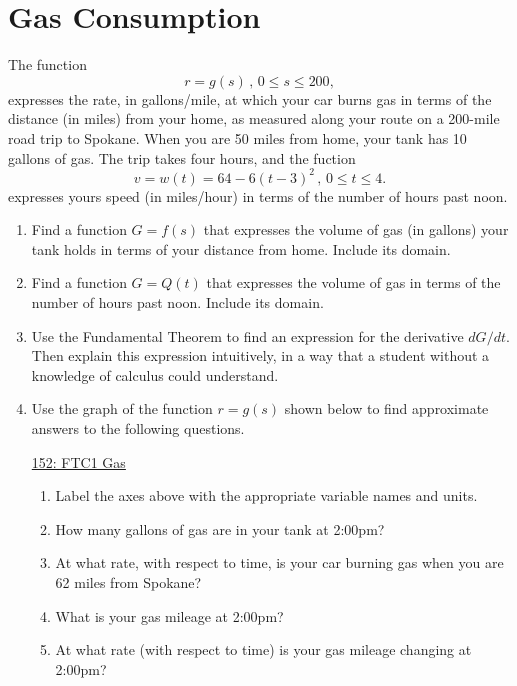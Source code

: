 \documentclass{ximera}
\begin{document}
\section{Gas Consumption}


\begin{question} \label{QoODROOOD}

The function
\[
 r =g(s) \, , \, 0\leq s \leq 200 ,
\]
 expresses the rate, in gallons/mile, at which your car burns gas in terms of the distance (in miles) from your home, as measured along your route on a 200-mile road trip to Spokane. When you are 50 miles from home, your tank has 10 gallons of gas. The trip takes four hours, and the fuction
\[
 v =w(t) = 64 - 6(t-3)^2 \, , \, 0 \leq t \leq 4. 
 \]
expresses yours speed (in miles/hour) in terms of the number of hours past noon.

\begin{enumerate}

\item Find a function $G = f(s)$ that expresses the volume of gas (in gallons) your tank holds in terms of your distance from home. Include its domain.

\item Find a function $G = Q(t)$ that expresses the volume of gas in terms of the number of hours past noon. Include its
 domain.

\item Use the Fundamental Theorem to find an expression for the derivative $dG/dt$. Then explain this expression intuitively, in a way that a student without a knowledge of calculus could understand.

\item Use the graph of the function $r = g(s)$ shown below to find approximate answers to the following questions.

\begin{onlineOnly}
    \begin{center}
\end{center}
\end{onlineOnly}

\href{https://www.desmos.com/calculator/tzmqpsznou}{152: FTC1 Gas}


\begin{enumerate}
\item Label the axes above with the appropriate variable names and units.

\item How many gallons of gas are in your tank at 2:00pm?

\item At what rate, with respect to time, is your car burning gas when you are 62 miles from Spokane?

\item What is your gas mileage at 2:00pm? 

\item At what rate (with respect to time) is your gas mileage changing at 2:00pm?
\end{enumerate}
\end{enumerate}
\end{question}
\end{document}
